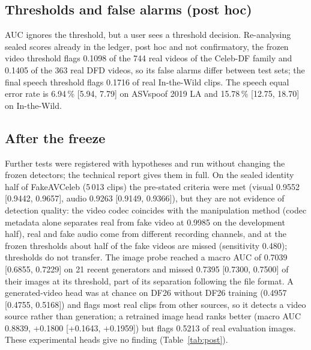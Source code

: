 \documentclass[conference,a4paper]{IEEEtran_nodash}
\begin{document}
\subsection{Thresholds and false alarms (post hoc)}
AUC ignores the threshold, but a user sees a threshold decision. Re-analysing
sealed scores already in the ledger, post hoc and not confirmatory, the frozen
video threshold flags 0.1098 of the 744 real videos of the Celeb-DF family and
0.1405 of the 363 real DFD videos, so its false alarms differ between test sets; the
final speech threshold flags 0.1716 of real In-the-Wild clips. The speech equal
error rate is 6.94\,\% [5.94, 7.79] on ASVspoof 2019 LA and 15.78\,\% [12.75,
18.70] on In-the-Wild. %

\subsection{After the freeze}
Further tests were registered with hypotheses and run without changing the frozen
detectors; the technical report gives them in full. On the sealed identity half of
FakeAVCeleb (5\,013 clips) the pre-stated criteria were met (visual 0.9552
[0.9442, 0.9657], audio 0.9263 [0.9149, 0.9366]), but they are not evidence of
detection quality: the video codec coincides with the manipulation method (codec
metadata alone separates real from fake video at 0.9985 on the development half),
real and fake audio come from different recording channels, and at the frozen
thresholds about half of the fake videos are missed (sensitivity 0.480); thresholds
do not transfer. The image probe reached a macro AUC of 0.7039 [0.6855, 0.7229] on
21 recent generators and missed 0.7395 [0.7300, 0.7500] of their images at its
threshold, part of its separation following the file format. A generated-video head
was at chance on DF26 without DF26 training (0.4957 [0.4755, 0.5168]) and flags most
real clips from other sources, so it detects a video source rather than
generation; a retrained image head ranks better (macro AUC 0.8839, +0.1800
[+0.1643, +0.1959]) but flags 0.5213 of real evaluation images. These experimental
heads give no finding (Table~\ref{tab:post}). %
\end{document}
